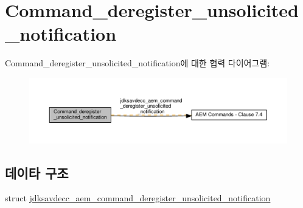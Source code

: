 \hypertarget{group__command__deregister__unsolicited__notification}{}\section{Command\+\_\+deregister\+\_\+unsolicited\+\_\+notification}
\label{group__command__deregister__unsolicited__notification}
Command\+\_\+deregister\+\_\+unsolicited\+\_\+notification에 대한 협력 다이어그램\+:
\nopagebreak
\begin{figure}[H]
\begin{center}
\leavevmode
\includegraphics[width=350pt]{group__command__deregister__unsolicited__notification}
\end{center}
\end{figure}
\subsection*{데이타 구조}
\begin{DoxyCompactItemize}
\item 
struct \hyperlink{structjdksavdecc__aem__command__deregister__unsolicited__notification}{jdksavdecc\+\_\+aem\+\_\+command\+\_\+deregister\+\_\+unsolicited\+\_\+notification}
\end{DoxyCompactItemize}
